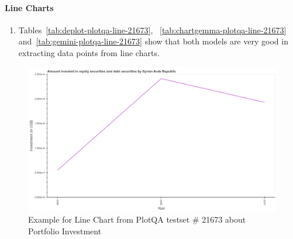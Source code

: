 \documentclass[
	letterpaper, %
]{jdf}
\begin{document}
       \paragraph{Line Charts}\label{par:line-errors}
       \begin{enumerate}
  \item Tables~\ref{tab:deplot-plotqa-line-21673}, ~\ref{tab:chartgemma-plotqa-line-21673} and~\ref{tab:gemini-plotqa-line-21673} show that both models are very good in extracting data points from line charts.
       \end{enumerate}
\begin{figure}
   \includegraphics{test-sample/plotqa/images/line/21673.png}
   \caption{Example for Line Chart from PlotQA testset \# 21673 about Portfolio Investment}
   \label{fig:plotqa-line-21673}
   \end{figure}




\end{document}

